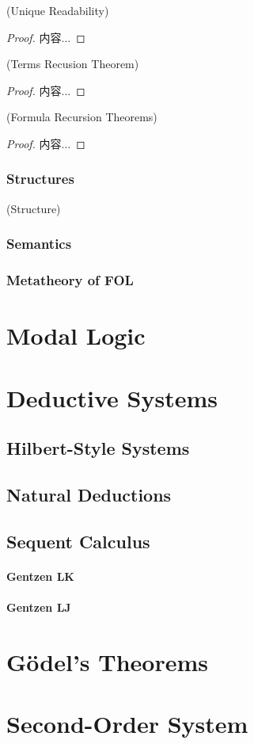 \documentclass[Total.tex]{subfiles}
\begin{document}
				\begin{proposition}
					(Unique Readability)
				\end{proposition}
				\begin{proof}
					内容...
				\end{proof}
				
				\begin{proposition}
					(Terms Recusion Theorem)
				\end{proposition}
				\begin{proof}
					内容...
				\end{proof}
				
				\begin{proposition}
					(Formula Recursion Theorems)
				\end{proposition}
				\begin{proof}
					内容...
				\end{proof}
				
				\subsection{Structures}
				
				\begin{Def}
					(Structure)
				\end{Def}
				
				\subsection{Semantics}
				
				\subsection{Metatheory of FOL}
		\chapter{Modal Logic}
			
		\chapter{Deductive Systems}
			\section{Hilbert-Style Systems}
			\section{Natural Deductions}
			\section{Sequent Calculus}
				\subsubsection{Gentzen LK}
				\subsubsection{Gentzen LJ}
				
		\chapter{Gödel's Theorems}
		
		\chapter{Second-Order System}
\end{document}
